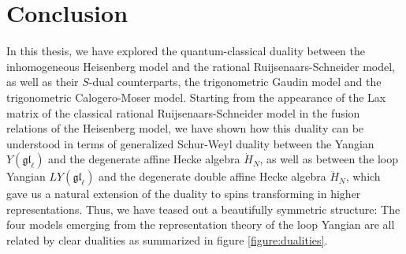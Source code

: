 \documentclass[11pt]{report}
\newtheorem{lemma}[theorem]{Lemma}
\newtheorem{prop}[theorem]{Proposition}
\theoremstyle{definition}
\theoremstyle{remark}
\theoremstyle{remark}
\begin{document}
%
%

\chapter{Conclusion}\label{chapter:conclusion}

In this thesis, we have explored the quantum-classical duality between the inhomogeneous Heisenberg model and the rational Ruijsenaars-Schneider model, as well as their $S$-dual counterparts, the trigonometric Gaudin model and the trigonometric Calogero-Moser model. Starting from the appearance of the Lax matrix of the classical rational Ruijsenaars-Schneider model in the fusion relations of the Heisenberg model, we have shown how this duality can be understood in terms of generalized Schur-Weyl duality between the Yangian $Y(\mathfrak{gl}_\ell)$ and the degenerate affine Hecke algebra $\dot H_N$, as well as between the loop Yangian $LY(\mathfrak{gl}_\ell)$ and the degenerate double affine Hecke algebra $\ddot H_N$, which gave us a natural extension of the duality to spins transforming in higher representations. Thus, we have teased out a beautifully symmetric structure: The four models emerging from the representation theory of the loop Yangian are all related by clear dualities as summarized in figure \ref{figure:dualities}.
\end{document}
